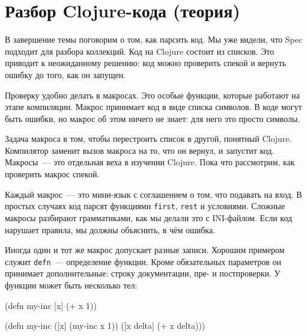 \section{Разбор Clojure-кода (теория)}


В завершение темы поговорим о том, как парсить код. Мы уже видели, что Spec
подходит для разбора коллекций. Код на Clojure состоит из списков. Это приводит
к неожиданному решению: код можно проверить спекой и вернуть ошибку до того, как
он запущен.

Проверку удобно делать в макросах. Это особые функции, которые работают на этапе
компиляции. Макрос принимает код в виде списка символов. В коде могут быть
ошибки, но макрос об этом ничего не знает: для него это просто символы.

Задача макроса в том, чтобы перестроить список в другой, понятный
Clojure. Компилятор заменит вызов макроса на то, что он вернул, и запустит
код. Макросы~--- это отдельная веха в изучении Clojure. Пока что рассмотрим, как
проверить макрос спекой.

Каждый макрос~--- это мини-язык с соглашением о том, что подавать на вход. В простых
случаях код парсят функциями \verb|first|, \verb|rest| и условиями. Сложные
макросы разбирают грамматиками, как мы делали это с INI-файлом. Если код
нарушает правила, мы должны объяснить, в чём ошибка.

Иногда один и тот же макрос допускает разные записи. Хорошим примером служит
\verb|defn|~--- определение функции. Кроме обязательных параметров он принимает
дополнительные: строку документации, пре- и постпроверки. У функции может быть
несколько тел:

\ifx\DEVICETYPE\MOBILE

\begin{english}
  \begin{clojure}
(defn my-inc
  [x]
  (+ x 1))
  \end{clojure}

\splitter


\splitter

  \begin{clojure}
(defn my-inc
  ([x]
   (my-inc x 1))
  ([x delta]
   (+ x delta)))
  \end{clojure}
\end{english}

